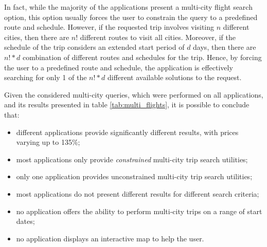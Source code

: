 In fact, while the majority of the applications present a multi-city flight search option, this option usually forces the user to constrain the query to a predefined route and schedule. However, if the requested trip involves visiting $n$ different cities, then there are $n!$ different routes to visit all cities. Moreover, if the schedule of the trip considers an extended start period of $d$ days, then there are $n!*d$ combination of different routes and schedules for the trip. Hence, by forcing the user to a predefined route and schedule, the application is effectively searching for only 1 of the $n!*d$ different available solutions to the request. 

Given the considered multi-city queries, which were performed on all applications, and its results presented in table \ref{tab:multi_flights}, it is possible to conclude that: 

\begin{itemize}[itemsep=0pt]
  \item different applications provide significantly different results, with prices varying up to 135\%;
  \item most applications only provide \textit{constrained} multi-city trip search utilities;
  \item only one application provides unconstrained multi-city trip search utilities;
  \item most applications do not present different results for different search criteria;
  \item no application offers the ability to perform multi-city trips on a range of start dates; 
  \item no application displays an interactive map to help the user.
\end{itemize}

